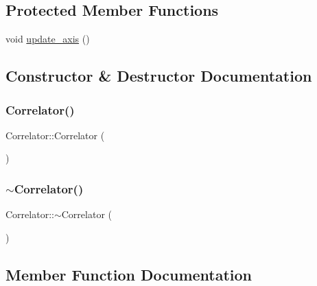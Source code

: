 \subsection*{Protected Member Functions}
\begin{DoxyCompactItemize}
\item 
void \hyperlink{class_correlator_af4caefcd9465346248a5dc1949846f3e}{update\+\_\+axis} ()
\end{DoxyCompactItemize}


\subsection{Constructor \& Destructor Documentation}
\mbox{\label{class_correlator_a6114955836dba0b4b61138490cd3fe91}} 
\subsubsection{\texorpdfstring{Correlator()}{Correlator()}}
{\footnotesize\ttfamily Correlator\+::\+Correlator (\begin{DoxyParamCaption}{ }\end{DoxyParamCaption})\hspace{0.3cm}{\ttfamily [inline]}}

\mbox{\label{class_correlator_a85102747d6ae6ff216218a001683b942}} 
\subsubsection{\texorpdfstring{$\sim$\+Correlator()}{~Correlator()}}
{\footnotesize\ttfamily Correlator\+::$\sim$\+Correlator (\begin{DoxyParamCaption}{ }\end{DoxyParamCaption})\hspace{0.3cm}{\ttfamily [default]}}



\subsection{Member Function Documentation}
\mbox{\label{class_correlator_aecdb727bbdb02330f00f7b19564db448}} 
